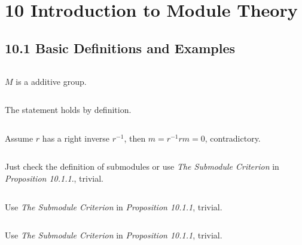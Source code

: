 \documentclass{article}
\newcommand{\tmdummy}{$\mbox{}$}
\newcommand{\tmem}[1]{{\em #1\/}}
\newenvironment{tmindent}{\begin{tmparmod}{1.5em}{0pt}{0pt}}{\end{tmparmod}}
\newenvironment{tmparmod}[3]{\begin{list}{}{\setlength{\topsep}{0pt}\setlength{\leftmargin}{#1}\setlength{\rightmargin}{#2}\setlength{\parindent}{#3}\setlength{\listparindent}{\parindent}\setlength{\itemindent}{\parindent}\setlength{\parsep}{\parskip}} \item[]}{\end{list}}
{\theorembodyfont{\rmfamily\small}\newtheorem{exercise}{Exercise}}
\begin{document}
\section*{10 Introduction to Module Theory}

\subsection*{10.1 Basic Definitions and Examples}

\begin{exercise}
  {\tmdummy}
  
  \begin{tmindent}
    $M$ is a additive group.
  \end{tmindent}
\end{exercise}

\begin{exercise}
  {\tmdummy}
  
  \begin{tmindent}
    The statement holds by definition.
  \end{tmindent}
\end{exercise}

\begin{exercise}
  {\tmdummy}
  
  \begin{tmindent}
    Assume $r$ has a right inverse $r^{- 1}$, then $m = r^{- 1} rm = 0$,
    contradictory.
  \end{tmindent}
\end{exercise}

\begin{exercise}
  {\tmdummy}
  
  \begin{tmindent}
    Just check the definition of submodules or use {\tmem{The Submodule
    Criterion}} in {\tmem{Proposition 10.1.1}}., trivial.
  \end{tmindent}
\end{exercise}

\begin{exercise}
  {\tmdummy}
  
  \begin{tmindent}
    Use {\tmem{The Submodule Criterion}} in {\tmem{Proposition 10.1.1}},
    trivial.
  \end{tmindent}
\end{exercise}

\begin{exercise}
  {\tmdummy}
  
  \begin{tmindent}
    Use {\tmem{The Submodule Criterion}} in {\tmem{Proposition 10.1.1}},
    trivial.
  \end{tmindent}
\end{exercise}
\end{document}
